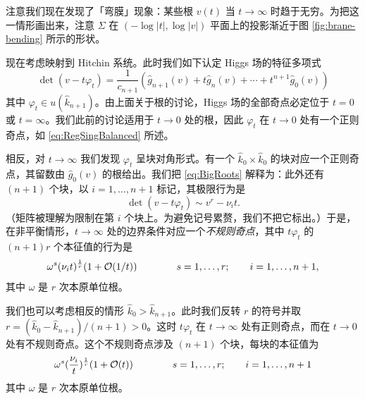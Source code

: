 注意我们现在发现了「弯膜」现象：某些根 $v(t)$ 当 $t\to \infty$ 时趋于无穷。为把这一情形画出来，注意 $\Sigma$ 在 $(-\log\vert t\vert, \log \vert v \vert)$ 平面上的投影渐近于图 \ref{fig:brane-bending} 所示的形状。

现在考虑映射到 Hitchin 系统。此时我们如下认定 Higgs 场的特征多项式
\begin{equation}\label{eq:ch05-detchar}
\det(v - t \varphi_t) = \frac{1}{c_{n+1}} \left( \hat g_{n+1}(v) + t
\hat g_n(v) + \cdots + t^{n+1} \hat g_0(v) \right)
\end{equation}
其中 $\varphi_t \in u(\hat k_{n+1})$。由上面关于根的讨论，Higgs 场的全部奇点必定位于 $t=0$ 或 $t=\infty$。我们此前的讨论适用于 $t\to 0$ 处的根，因此 $\varphi_t$ 在 $t \to 0$ 处有一个正则奇点，如 \eqref{eq:RegSingBalanced} 所述。

相反，对 $t\to \infty $ 我们发现 $\varphi_t$ 呈块对角形式。有一个 $\hat k_0 \times \hat k_0$ 的块对应一个正则奇点，其留数由 $\hat g_0(v)$ 的根给出。我们把 \eqref{eq:BigRoots} 解释为：此外还有 $(n+1)$ 个块，以 $i=1,\dots, n+1$ 标记，其极限行为是
\begin{equation}\label{eq:ch05-blocklimit}
\det(v-t\varphi_t) \sim v^r - \nu_i t.
\end{equation}
（矩阵被理解为限制在第 $i$ 个块上。为避免记号累赘，我们不把它标出。）于是，在非平衡情形，$t\to \infty$ 处的边界条件对应一个\emph{不规则奇点}，其中 $t\varphi_t$ 的 $(n+1)r$ 个本征值的行为是
\begin{equation}\label{eq:ch05-eiginfty}
\omega^s (\nu_i t)^{\frac{1}{r}} (1 + \mathcal{O}(1/t)) \qquad\qquad
s=1,\dots, r;\qquad  i = 1, \dots, n+1,
\end{equation}
其中 $\omega$ 是 $r$ 次本原单位根。

我们也可以考虑相反的情形 $\hat k_0 > \hat k_{n+1}$。此时我们反转 $r$ 的符号并取 $r = (\hat k_0-\hat k_{n+1})/(n+1)>0$。这时 $t \varphi_t$ 在 $t\to \infty$ 处有正则奇点，而在 $t \to 0$ 处有不规则奇点。这个不规则奇点涉及 $(n+1)$ 个块，每块的本征值为
\begin{equation}\label{eq:ch05-eigzero}
\omega^s (\frac{\nu_i}{t})^{\frac{1}{r}} (1 + \mathcal{O}(t)) \qquad\qquad
s=1,\dots, r;\qquad  i = 1, \dots, n+1
\end{equation}
其中 $\omega$ 是 $r$ 次本原单位根。

